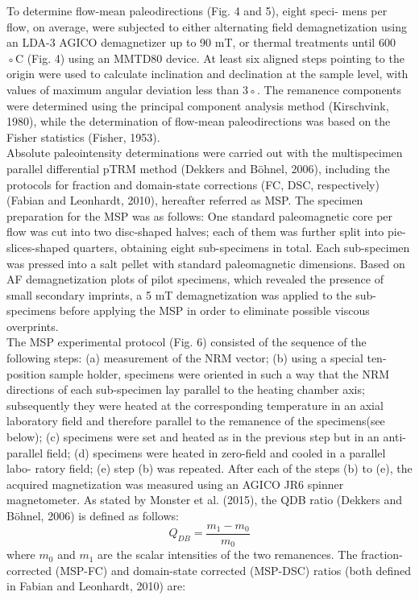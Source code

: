 \documentclass[review]{elsarticle}
\begin{document}
To determine flow-mean paleodirections (Fig. 4 and 5), eight speci-
mens per flow, on average, were subjected to either alternating field
demagnetization using an LDA-3 AGICO demagnetizer up to 90 mT, or
thermal treatments until 600 ◦C (Fig. 4) using an MMTD80 device. At
least six aligned steps pointing to the origin were used to calculate
inclination and declination at the sample level, with values of maximum
angular deviation less than 3◦. The remanence components were
determined using the principal component analysis method (Kirschvink,
1980), while the determination of flow-mean paleodirections was based
on the Fisher statistics (Fisher, 1953).
\\
Absolute paleointensity determinations were carried out with the
multispecimen parallel differential pTRM method (Dekkers and B{\"o}hnel,
2006), including the protocols for fraction and domain-state corrections
(FC, DSC, respectively) (Fabian and Leonhardt, 2010), hereafter referred
as MSP. The specimen preparation for the MSP was as follows: One
standard paleomagnetic core per flow was cut into two disc-shaped
halves; each of them was further split into pie-slices-shaped quarters,
obtaining eight sub-specimens in total. Each sub-specimen was pressed
into a salt pellet with standard paleomagnetic dimensions. Based on AF
demagnetization plots of pilot specimens, which revealed the presence
of small secondary imprints, a 5 mT demagnetization was applied to the
sub-specimens before applying the MSP in order to eliminate possible
viscous overprints.
\\
The MSP experimental protocol (Fig. 6) consisted of the sequence of
the following steps: (a) measurement of the NRM vector; (b) using a
special ten-position sample holder, specimens were oriented in such a
way that the NRM directions of each sub-specimen lay parallel to the
heating chamber axis; subsequently they were heated at the corresponding temperature in an axial laboratory field and therefore
parallel to the remanence of the specimens(see below); (c) specimens
were set and heated as in the previous step but in an anti-parallel field;
(d) specimens were heated in zero-field and cooled in a parallel labo-
ratory field; (e) step (b) was repeated. After each of the steps (b) to (e),
the acquired magnetization was measured using an AGICO JR6 spinner
magnetometer. As stated by Monster et al. (2015), the QDB ratio
(Dekkers and B{\"o}hnel, 2006) is defined as follows:
\\
$$
Q_{DB}=\frac{m_1-m_0}{m_0}
$$
where $m_0$ and $m_1$ are the scalar intensities of the two remanences. The fraction-corrected (MSP-FC) and domain-state corrected (MSP-DSC) ratios (both defined in Fabian and Leonhardt, 2010) are:
\end{document}
